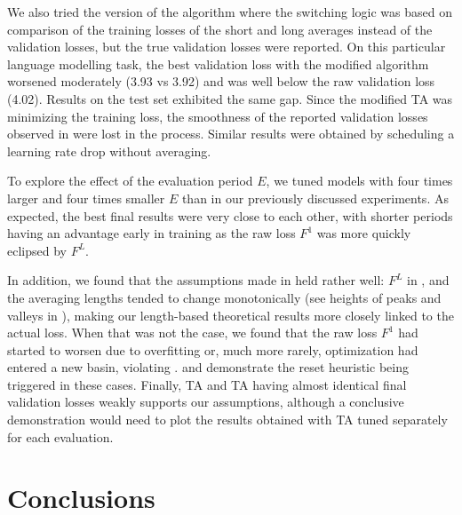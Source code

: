 \documentclass[twocolumn]{article}
\newcommand{\tta}{\textlf{2}TA}
\begin{document}
We also tried the version of the algorithm where the switching logic was based on comparison of the training losses of the short and long averages instead of the validation losses, but the true validation losses were reported.
On this particular language modelling task, the best validation loss with the modified algorithm worsened moderately (3.93 vs 3.92) and was well below the raw validation loss (4.02).
Results on the test set exhibited the same gap.
Since the modified \tta{} was minimizing the training loss, the smoothness of the reported validation losses observed in  were lost in the process.
Similar results were obtained by scheduling a learning rate drop without averaging.

To explore the effect of the evaluation period $E$, we tuned models with four times larger and four times smaller $E$ than in our previously discussed experiments.
As expected, the best final results were very close to each other, with shorter periods having an advantage early in training as the raw loss $F^1$ was more quickly eclipsed by $F^L$.

In addition, we found that the assumptions made in  held rather well: $F^L$ in , and the averaging lengths tended to change monotonically (see heights of peaks and valleys in ), making our length-based theoretical results more closely linked to the actual loss.
When that was not the case, we found that the raw loss $F^1$ had started to worsen due to overfitting or, much more rarely, optimization had entered a new basin, violating .
 and  demonstrate the reset heuristic being triggered in these cases.
Finally, TA and \tta{} having almost identical final validation losses weakly supports our assumptions, although a conclusive demonstration would need to plot the results obtained with TA tuned separately for each evaluation.

\section{Conclusions}
\end{document}
